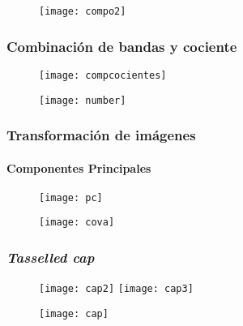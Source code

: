 \documentclass[14pt]{beamer}
\begin{document}
\begin{frame}
  \begin{figure}
    \centering
    \texttt{[image: compo2]}
  \end{figure}
\tiny{}
\end{frame}
\begin{frame}
\frametitle{Combinación de bandas y cociente}
  \begin{figure}
    \centering
    \texttt{[image: compcocientes]}
  \end{figure}
\end{frame}
\begin{frame}
  \begin{figure}
    \centering
    \texttt{[image: number]}
  \end{figure}
\tiny{}
\end{frame}
\begin{frame}
\frametitle{Transformación de imágenes}
\framesubtitle{Componentes Principales}
  \begin{figure}
    \centering
    \texttt{[image: pc]}
  \end{figure}
\tiny{}
\end{frame}
\begin{frame}
  \begin{figure}
    \centering
    \texttt{[image: cova]}
  \end{figure}
\tiny{}
\end{frame}
\begin{frame}
\frametitle{\emph{Tasselled cap}}
  \begin{figure}
    \centering
    \texttt{[image: cap2]}
     \texttt{[image: cap3]}
  \end{figure}
\tiny{}
\end{frame}
\begin{frame}
  \begin{figure}
    \centering
    \texttt{[image: cap]}
  \end{figure}
\tiny{}
\end{frame}
\end{document}
